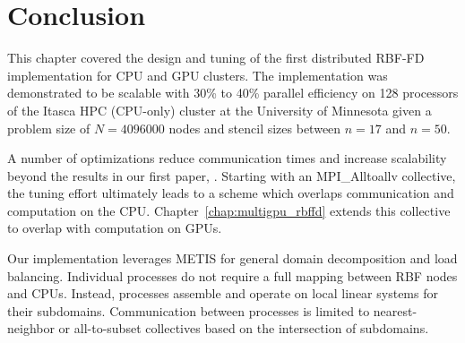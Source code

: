 \documentclass{report}
\begin{document}
\section{Conclusion}

This chapter covered the design and tuning of the first distributed RBF-FD implementation for CPU and GPU clusters. The implementation was demonstrated to be scalable with 30\% to 40\% parallel efficiency on 128 processors of the Itasca HPC (CPU-only) cluster at the University of Minnesota given a problem size of $N=4096000$ nodes and stencil sizes between $n=17$ and $n=50$. 

A number of optimizations reduce communication times and increase scalability beyond the results in our first paper, \cite{BolligFlyerErlebacher2012}. Starting with an MPI\_Alltoallv collective, the tuning effort ultimately leads to a scheme which overlaps communication and computation on the CPU. Chapter~\ref{chap:multigpu_rbffd} extends this collective to overlap with computation on GPUs. 

Our implementation leverages METIS for general domain decomposition and load balancing. Individual processes do not require a full mapping between RBF nodes and CPUs. Instead, processes assemble and operate on local linear systems for their subdomains. Communication between processes is limited to nearest-neighbor or all-to-subset collectives based on the intersection of subdomains. 
		



\ifstandalone


\end{document}
